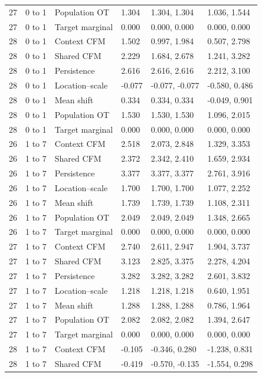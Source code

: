 \documentclass[10pt,a4paper]{article}
\begin{document}
{{\begin{longtable}{@{}p{14mm}p{18mm}p{36mm}p{24mm}p{32mm}p{39mm}@{}}
27 & 0 to 1 & Population OT & 1.304 & 1.304, 1.304 & 1.036, 1.544\\
27 & 0 to 1 & Target marginal & 0.000 & 0.000, 0.000 & 0.000, 0.000\\
28 & 0 to 1 & Context CFM & 1.502 & 0.997, 1.984 & 0.507, 2.798\\
28 & 0 to 1 & Shared CFM & 2.229 & 1.684, 2.678 & 1.241, 3.282\\
28 & 0 to 1 & Persistence & 2.616 & 2.616, 2.616 & 2.212, 3.100\\
28 & 0 to 1 & Location--scale & -0.077 & -0.077, -0.077 & -0.580, 0.486\\
28 & 0 to 1 & Mean shift & 0.334 & 0.334, 0.334 & -0.049, 0.901\\
28 & 0 to 1 & Population OT & 1.530 & 1.530, 1.530 & 1.096, 2.015\\
28 & 0 to 1 & Target marginal & 0.000 & 0.000, 0.000 & 0.000, 0.000\\
26 & 1 to 7 & Context CFM & 2.518 & 2.073, 2.848 & 1.329, 3.353\\
26 & 1 to 7 & Shared CFM & 2.372 & 2.342, 2.410 & 1.659, 2.934\\
26 & 1 to 7 & Persistence & 3.377 & 3.377, 3.377 & 2.761, 3.916\\
26 & 1 to 7 & Location--scale & 1.700 & 1.700, 1.700 & 1.077, 2.252\\
26 & 1 to 7 & Mean shift & 1.739 & 1.739, 1.739 & 1.108, 2.311\\
26 & 1 to 7 & Population OT & 2.049 & 2.049, 2.049 & 1.348, 2.665\\
26 & 1 to 7 & Target marginal & 0.000 & 0.000, 0.000 & 0.000, 0.000\\
27 & 1 to 7 & Context CFM & 2.740 & 2.611, 2.947 & 1.904, 3.737\\
27 & 1 to 7 & Shared CFM & 3.123 & 2.825, 3.375 & 2.278, 4.204\\
27 & 1 to 7 & Persistence & 3.282 & 3.282, 3.282 & 2.601, 3.832\\
27 & 1 to 7 & Location--scale & 1.218 & 1.218, 1.218 & 0.640, 1.951\\
27 & 1 to 7 & Mean shift & 1.288 & 1.288, 1.288 & 0.786, 1.964\\
27 & 1 to 7 & Population OT & 2.082 & 2.082, 2.082 & 1.394, 2.647\\
27 & 1 to 7 & Target marginal & 0.000 & 0.000, 0.000 & 0.000, 0.000\\
28 & 1 to 7 & Context CFM & -0.105 & -0.346, 0.280 & -1.238, 0.831\\
28 & 1 to 7 & Shared CFM & -0.419 & -0.570, -0.135 & -1.554, 0.298\\

\end{longtable}}}
\end{document}
